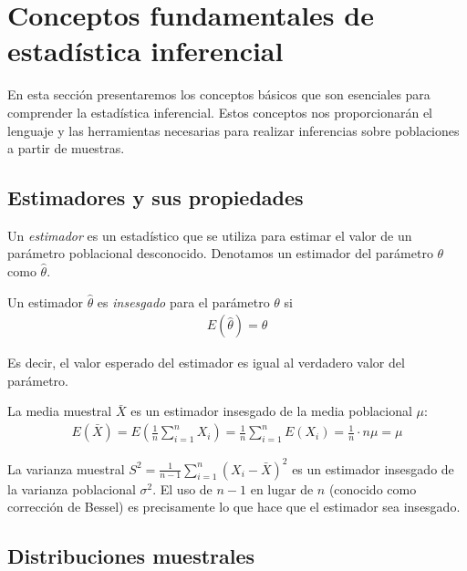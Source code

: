 \section*{Conceptos fundamentales de estadística inferencial}

En esta sección presentaremos los conceptos básicos que son esenciales para comprender la estadística inferencial. Estos conceptos nos proporcionarán el lenguaje y las herramientas necesarias para realizar inferencias sobre poblaciones a partir de muestras.

\subsection*{Estimadores y sus propiedades}

Un \emph{estimador} es un estadístico que se utiliza para estimar el valor de un parámetro poblacional desconocido. Denotamos un estimador del parámetro $\theta$ como $\hat{\theta}$.

\begin{definicion}
	\label{def:5.1.1}
	Un estimador $\hat{\theta}$ es \emph{insesgado} para el parámetro $\theta$ si
	\begin{align}
		E(\hat{\theta}) = \theta
	\end{align}

	Es decir, el valor esperado del estimador es igual al verdadero valor del parámetro.
\end{definicion}

\begin{ejemplo}
	\label{exmp:sample-mean-unbiased}
	La media muestral $\bar{X}$ es un estimador insesgado de la media poblacional $\mu$:
	\begin{align}
		E(\bar{X}) = E\left(\frac{1}{n}\sum_{i=1}^n X_i\right) = \frac{1}{n}\sum_{i=1}^n E(X_i) = \frac{1}{n} \cdot n\mu = \mu
	\end{align}
\end{ejemplo}

\begin{observacion}
	La varianza muestral $S^2 = \frac{1}{n-1}\sum_{i=1}^n (X_i - \bar{X})^2$ es un estimador insesgado de la varianza poblacional $\sigma^2$. El uso de $n-1$ en lugar de $n$ (conocido como corrección de Bessel) es precisamente lo que hace que el estimador sea insesgado.
\end{observacion}

\subsection*{Distribuciones muestrales}

